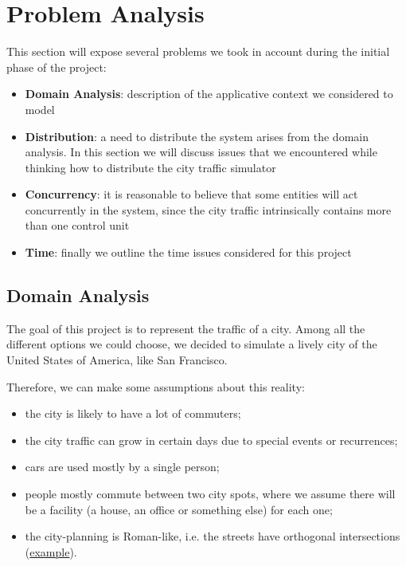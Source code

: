 \section{Problem Analysis}

This section will expose several problems we took in account during the
initial phase of the project:

\begin{itemize}
\item \textbf{Domain Analysis}: description of the applicative context we
  considered to model
\item \textbf{Distribution}: a need to distribute the system arises from the
  domain analysis. In this section we will discuss issues that we encountered
  while thinking how to distribute the city traffic simulator
\item \textbf{Concurrency}: it is reasonable to believe that some entities
  will act concurrently in the system, since the city traffic intrinsically
  contains more than one control unit
\item \textbf{Time}: finally we outline the time issues considered for this project 
\end{itemize}

\subsection{Domain Analysis}\label{sec:pa-domain}
The goal of this project is to represent the traffic of a city. Among all the
different options we could choose, we decided to simulate a lively city of
the United States of America, like San Francisco.

Therefore, we can make some assumptions about this reality:

\begin{itemize}
\item the city is likely to have a lot of commuters;
\item the city traffic can grow in certain days due to special events or
  recurrences;
\item cars are used mostly by a single person;
\item people mostly commute between two city spots, where we assume there
  will be a facility (a house, an office or something else) for each one;
\item the city-planning is Roman-like, i.e. the streets have orthogonal
  intersections (\href{https://www.google.it/maps/place/San+Francisco,+California,+Stati+Uniti/@37.7766566,-122.4330836,16z/data=!4m2!3m1!1s0x80859a6d00690021:0x4a501367f076adff}{example}).
\end{itemize}

